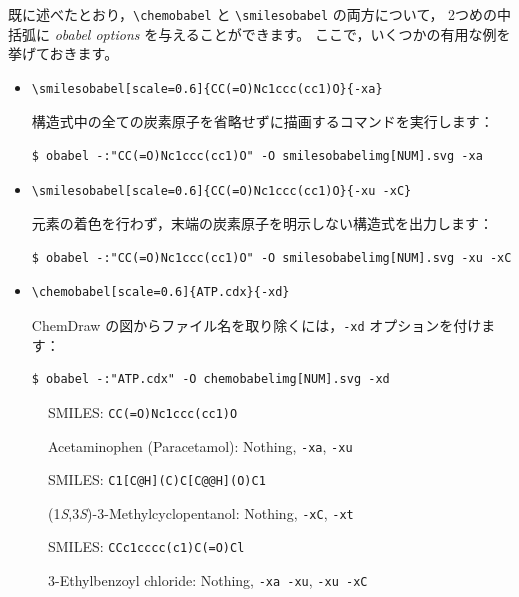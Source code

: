 \documentclass[dvipdfmx,12pt]{jsarticle}
\begin{document}
既に述べたとおり，\verb|\chemobabel| と \verb|\smilesobabel| の両方について，
2つめの中括弧に \textit{obabel options} を与えることができます。
ここで，いくつかの有用な例を挙げておきます。
\begin{itemize}
\item
\begin{verbatim}
\smilesobabel[scale=0.6]{CC(=O)Nc1ccc(cc1)O}{-xa}
\end{verbatim}
構造式中の全ての炭素原子を省略せずに描画するコマンドを実行します：
\begin{verbatim}
$ obabel -:"CC(=O)Nc1ccc(cc1)O" -O smilesobabelimg[NUM].svg -xa
\end{verbatim}
\item
\begin{verbatim}
\smilesobabel[scale=0.6]{CC(=O)Nc1ccc(cc1)O}{-xu -xC}
\end{verbatim}
元素の着色を行わず，末端の炭素原子を明示しない構造式を出力します：
\begin{verbatim}
$ obabel -:"CC(=O)Nc1ccc(cc1)O" -O smilesobabelimg[NUM].svg -xu -xC
\end{verbatim}
\item
\begin{verbatim}
\chemobabel[scale=0.6]{ATP.cdx}{-xd}
\end{verbatim}
ChemDraw の図からファイル名を取り除くには，\texttt{-xd} オプションを付けます：
\begin{verbatim}
$ obabel -:"ATP.cdx" -O chemobabelimg[NUM].svg -xd
\end{verbatim}
\end{itemize}

\begin{figure}[ht]
  \centering
  \caption{Acetaminophen (Paracetamol): Nothing, \texttt{-xa}, \texttt{-xu}}
  SMILES: \verb|CC(=O)Nc1ccc(cc1)O|
\end{figure}

\begin{figure}[ht]
  \centering
  \caption{(1\textit{S},3\textit{S})-3-Methylcyclopentanol: Nothing, \texttt{-xC}, \texttt{-xt}}
  SMILES: \verb|C1[C@H](C)C[C@@H](O)C1|
\end{figure}

\begin{figure}[ht]
  \centering
  \caption{3-Ethylbenzoyl chloride: Nothing, \texttt{-xa -xu}, \texttt{-xu -xC}}
  SMILES: \verb|CCc1cccc(c1)C(=O)Cl|
\end{figure}
\end{document}
